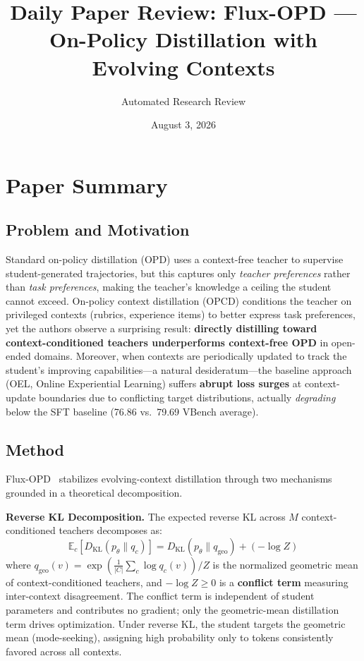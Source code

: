 \documentclass[11pt,a4paper]{article}
\title{Daily Paper Review: Flux-OPD --- On-Policy Distillation with Evolving Contexts}
\author{Automated Research Review}
\date{August 3, 2026}
\begin{document}
\maketitle

\section{Paper Summary}

\subsection{Problem and Motivation}
Standard on-policy distillation (OPD) uses a context-free teacher to supervise student-generated trajectories, but this captures only \emph{teacher preferences} rather than \emph{task preferences}, making the teacher's knowledge a ceiling the student cannot exceed. On-policy context distillation (OPCD) conditions the teacher on privileged contexts (rubrics, experience items) to better express task preferences, yet the authors observe a surprising result: \textbf{directly distilling toward context-conditioned teachers underperforms context-free OPD} in open-ended domains. Moreover, when contexts are periodically updated to track the student's improving capabilities---a natural desideratum---the baseline approach (OEL, Online Experiential Learning) suffers \textbf{abrupt loss surges} at context-update boundaries due to conflicting target distributions, actually \emph{degrading} below the SFT baseline (76.86 vs.\ 79.69 VBench average).

\subsection{Method}
Flux-OPD~\cite{wang2026fluxopd} stabilizes evolving-context distillation through two mechanisms grounded in a theoretical decomposition.

\textbf{Reverse KL Decomposition.} The expected reverse KL across $M$ context-conditioned teachers decomposes as:
\begin{equation}
    \mathbb{E}_{c}[D_{\mathrm{KL}}(p_\theta \| q_c)] = D_{\mathrm{KL}}(p_\theta \| q_{\mathrm{geo}}) + (-\log Z)
\end{equation}
where $q_{\mathrm{geo}}(v) = \exp(\frac{1}{|C|}\sum_{c} \log q_c(v)) / Z$ is the normalized geometric mean of context-conditioned teachers, and $-\log Z \geq 0$ is a \textbf{conflict term} measuring inter-context disagreement. The conflict term is independent of student parameters and contributes no gradient; only the geometric-mean distillation term drives optimization. Under reverse KL, the student targets the geometric mean (mode-seeking), assigning high probability only to tokens consistently favored across all contexts.
\end{document}
